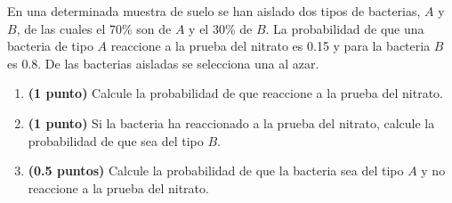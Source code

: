 
En una determinada muestra de suelo se han aislado dos tipos de bacterias,
$A$ y $B$, de las cuales el 70\% son de $A$ y el 30\% de $B$. La probabilidad
de que una bacteria de tipo $A$ reaccione a la prueba del nitrato es 0.15
y para la bacteria $B$ es 0.8. De las bacterias aisladas se selecciona una al azar.
\begin{enumerate}[label=\alph*)]
  \item \textbf{(1 punto)} Calcule la probabilidad de que reaccione a la
  prueba del nitrato.
  \item \textbf{(1 punto)} Si la bacteria ha reaccionado a la prueba del
  nitrato, calcule la probabilidad de que sea del tipo $B$.
  \item \textbf{(0.5 puntos)} Calcule la probabilidad de que la bacteria
  sea del tipo $A$ y no reaccione a la prueba del nitrato.
\end{enumerate}
